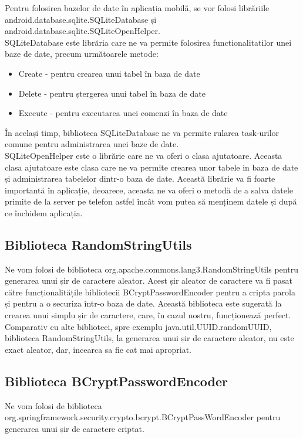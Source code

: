 \documentclass{article}
\begin{document}
		 Pentru folosirea bazelor de date în aplicația mobilă, se vor folosi librăriile android.database.sqlite.SQLiteDatabase și android.database.sqlite.SQLiteOpenHelper. \\

		SQLiteDatabase este librăria care ne va permite folosirea functionalitatilor unei baze de date, precum următoarele metode:

		\begin{itemize}
			\item Create - pentru crearea unui tabel în baza de date
			\item Delete - pentru ștergerea unui tabel în baza de date
			\item Execute - pentru executarea unei comenzi în baza de date
		\end{itemize}

		În același timp, biblioteca SQLiteDatabase ne va permite rularea task-urilor comune pentru administrarea unei baze de date.\\
		
		SQLiteOpenHelper este o librărie care ne va oferi o clasa ajutatoare. Aceasta clasa ajutatoare este clasa care ne va permite crearea unor tabele in baza de date și administrarea tabelelor dintr-o baza de date. Această librărie va fi foarte importantă în aplicație, deoarece, aceasta ne va oferi o metodă de a salva datele primite de la server pe telefon astfel încât vom putea să menținem datele și după ce închidem aplicația. 

		\subsection {Biblioteca RandomStringUtils} 
		\vspace{0.3cm}
		Ne vom folosi de biblioteca org.apache.commons.lang3.RandomStringUtils pentru generarea unui șir de caractere aleator. Acest șir aleator de caractere va fi pasat către funcționalitățile bibliotecii BCryptPasswordEncoder pentru a cripta parola și pentru a o securiza într-o baza de date. Această biblioteca este sugerată la crearea unui simplu șir de caractere, care, în cazul nostru, funcționează perfect.\\ 

		Comparativ cu alte biblioteci, spre exemplu java.util.UUID.randomUUID, biblioteca RandomStringUtils, la generarea unui șir de caractere aleator, nu este exact aleator, dar, incearca sa fie cat mai apropriat. 

		\subsection {Biblioteca BCryptPasswordEncoder}
		\vspace{0.3cm}
		Ne vom folosi de biblioteca org.springframework.security.crypto.bcrypt.BCryptPassWordEncoder pentru generarea unui șir de caractere criptat. \\
\end{document}
